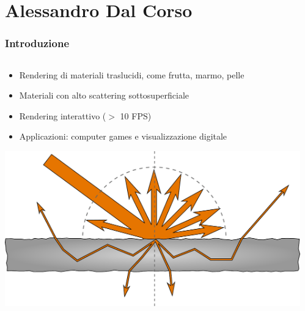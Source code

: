 \documentclass{beamer}
\begin{document}
\section{Alessandro Dal Corso}
\begin{frame}
    \frametitle{Introduzione}
\begin{columns}[t]
    \begin{column}{0.55\textwidth}
      \centering
			\begin{itemize}
				\item Rendering di materiali traslucidi, come frutta, marmo, pelle
				\item Materiali con alto scattering sottosuperficiale
				\item Rendering interattivo ($>$ 10 FPS) 
				\item Applicazioni: computer games e visualizzazione digitale
			\end{itemize}
		\vspace{0.5cm}
		\includegraphics[width=0.5\paperwidth]{diagram}	
    \end{column}
    \begin{column}{0.45\textwidth}
		\vspace{0.0cm}

\end{column}
\end{columns}
\end{frame}
\end{document}
